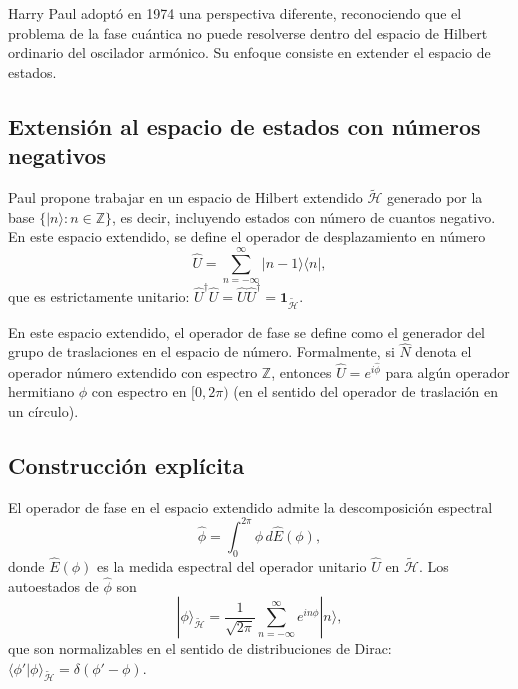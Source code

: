         Harry Paul \cite{Paul1974} adoptó en 1974 una perspectiva diferente, reconociendo que el problema de la fase cuántica no puede resolverse dentro del espacio de Hilbert ordinario del oscilador armónico. Su enfoque consiste en extender el espacio de estados.
 
        \subsection{Extensión al espacio de estados con números negativos}
        
            Paul propone trabajar en un espacio de Hilbert extendido $\tilde{\mathcal{H}}$ generado por la base $\{|n\rangle : n \in \mathbb{Z}\}$, es decir, incluyendo estados con número de cuantos negativo. En este espacio extendido, se define el operador de desplazamiento en número
            \begin{equation}
                \hat{U} = \sum_{n=-\infty}^{\infty} |n-1\rangle\langle n|,
                \label{eq:paul_U}
            \end{equation}
            que es estrictamente unitario: $\hat{U}^\dagger\hat{U} = \hat{U}\hat{U}^\dagger = \mathbf{1}_{\tilde{\mathcal{H}}}$.
            
            En este espacio extendido, el operador de fase se define como el generador del grupo de traslaciones en el espacio de número. Formalmente, si $\hat{N}$ denota el operador número extendido con espectro $\mathbb{Z}$, entonces $\hat{U} = e^{i\hat{\phi}}$ para algún operador hermitiano $\hat{\phi}$ con espectro en $[0, 2\pi)$ (en el sentido del operador de traslación en un círculo).
 
        \subsection{Construcción explícita}
        
            El operador de fase en el espacio extendido admite la descomposición espectral
            \begin{equation}
                \hat{\phi} = \int_0^{2\pi} \phi \, d\hat{E}(\phi),
                \label{eq:paul_fase}
            \end{equation}
            donde $\hat{E}(\phi)$ es la medida espectral del operador unitario $\hat{U}$ en $\tilde{\mathcal{H}}$. Los autoestados de $\hat{\phi}$ son
            \begin{equation}
                |\phi\rangle_{\tilde{\mathcal{H}}} = \frac{1}{\sqrt{2\pi}}\sum_{n=-\infty}^{\infty} e^{in\phi}|n\rangle,
            \end{equation}
            que son normalizables en el sentido de distribuciones de Dirac: $\langle\phi'|\phi\rangle_{\tilde{\mathcal{H}}} = \delta(\phi'-\phi)$.
        
